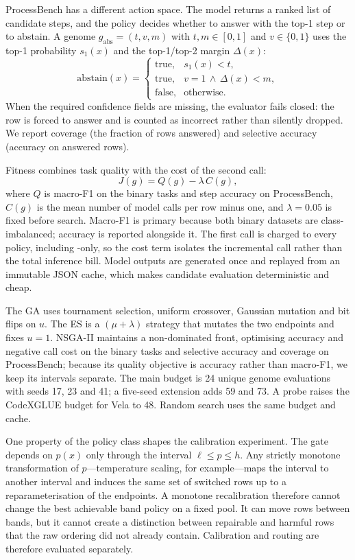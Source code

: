 ProcessBench has a different action space. The model returns a ranked list of
candidate steps, and the policy decides whether to answer with the top-1 step or
to abstain. A genome $g_{\mathrm{abs}}=(t,v,m)$ with $t,m\in[0,1]$ and
$v\in\{0,1\}$ uses the top-1 probability $s_1(x)$ and the top-1/top-2 margin
$\Delta(x)$:
\begin{equation}
\mathrm{abstain}(x)=
\begin{cases}
\text{true}, & s_1(x)<t,\\
\text{true}, & v=1\,\land\,\Delta(x)<m,\\
\text{false}, & \text{otherwise}.
\end{cases}
\label{eq:abstain}
\end{equation}
When the required confidence fields are missing, the evaluator fails closed:
the row is forced to answer and is counted as incorrect rather than silently
dropped. We report coverage (the fraction of rows answered) and selective
accuracy (accuracy on answered rows).

Fitness combines task quality with the cost of the second call:
\begin{equation}
J(g)=Q(g)-\lambda\,C(g),
\label{eq:fitness}
\end{equation}
where $Q$ is macro-F1 on the binary tasks and step accuracy on ProcessBench,
$C(g)$ is the mean number of model calls per row minus one, and $\lambda=0.05$
is fixed before search. Macro-F1 is primary because both binary datasets are
class-imbalanced; accuracy is reported alongside it. The first \noul{} call is
charged to every policy, including \noul-only, so the cost term isolates the
incremental call rather than the total inference bill. Model outputs are
generated once and replayed from an immutable JSON cache, which makes candidate
evaluation deterministic and cheap.

The GA uses tournament selection, uniform crossover, Gaussian mutation and bit
flips on $u$. The ES is a $(\mu+\lambda)$ strategy that mutates the two
endpoints and fixes $u=1$. NSGA-II maintains a non-dominated front, optimising
accuracy and negative call cost on the binary tasks and selective accuracy and
coverage on ProcessBench; because its quality objective is accuracy rather than
macro-F1, we keep its intervals separate. The main budget is 24 unique genome
evaluations with seeds 17, 23 and 41; a five-seed extension adds 59 and 73. A
probe raises the CodeXGLUE budget for Vela to 48. Random search uses the same budget
and cache.

One property of the policy class shapes the calibration experiment. The gate
depends on $p(x)$ only through the interval $\ell\le p\le h$. Any strictly
monotone transformation of $p$---temperature scaling, for example---maps the
interval to another interval and induces the same set of switched rows up to a
reparameterisation of the endpoints. A monotone recalibration therefore cannot
change the best achievable band policy on a fixed pool. It can move rows between
bands, but it cannot create a distinction between repairable and harmful rows
that the raw ordering did not already contain. Calibration and routing are
therefore evaluated separately.
